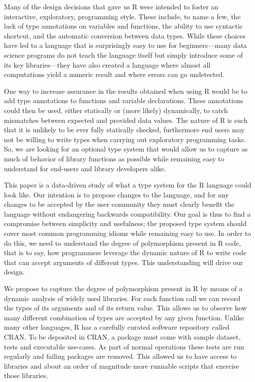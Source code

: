 \documentclass[acmsmall,10pt,review,anonymous]{acmart}\settopmatter{printfolios=true,printccs=false,printacmref=false}
\begin{document}
Many of the design decisions that gave us R were intended to foster an
interactive, exploratory, programming style. These include, to name a few,
the lack of type annotations on variables and functions, the ability to use
syntactic shortcut, and the automatic conversion between data types.  While
these choices have led to a language that is surprisingly easy to use for
beginners---many data science programs do not teach the language itself but
simply introduce some of its key libraries---they have also created a
language where almost all computations yield a numeric result and where
errors can go undetected.

One way to increase assurance in the results obtained when using R would be
to add type annotations to functions and variable declarations. These
annotations could then be used, either statically or (more likely)
dynamically, to catch mismatches between expected and provided data values.
The nature of R is such that it is unlikely to be ever fully statically
checked, furthermore end users may not be willing to write types when
carrying out exploratory programming tasks. So, we are looking for an
optional type system that would allow us to capture as much of behavior of
library functions as possible while remaining easy to understand for
end-users and library developers alike.

This paper is a data-driven study of what a type system for the R language
could look like. Our intention is to propose changes to the
language, and for any changes to be accepted by the user community they
must clearly benefit the language without endangering backwards
compatibility. Our goal is thus to find a compromise between simplicity and
usefulness; the proposed type system should cover most common programming
idioms while remaining easy to use. In order to do this, we need to
understand the degree of polymorphism present in R code, that is to say, how
programmers leverage the dynamic nature of R to write code that can accept
arguments of different types.  This understanding will drive our design.

We propose to capture the degree of polymorphism present in R by means
of a dynamic analysis of widely used libraries. For each function call we
can record the types of its arguments and of its return value. This allows
us to observe how many different combination of types are accepted by any
given function. Unlike many other languages, R has a carefully curated
software repository called CRAN. To be deposited in CRAN, a package must
come with sample dataset, tests and executable use-cases. As part of normal
operations these tests are run regularly and failing packages are removed.
This allowed us to have access to \PACKAGES libraries and about an order of
magnitude more runnable scripts that exercise those libraries.
\end{document}
